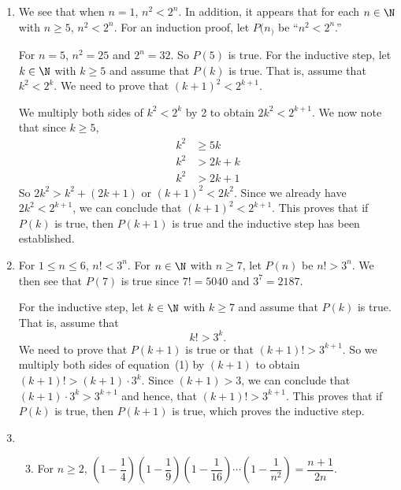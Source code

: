 \begin{enumerate}
\item We see that when $n = 1$, $n^2 < 2^n$.  In addition, it appears that for each $n \in \N$ with $n \geq 5$, $n^2 < 2^n$.  For an induction proof, let $P(n_)$ be ``$n^2 < 2^n$.''

\noindent
For $n = 5$, $n^2 = 25$ and $2^n = 32$.  So $P(5)$ is true.  For the inductive step, let $k \in \N$ with $k \geq 5$ and assume that $P(k)$ is true.  That is, assume that $k^2 < 2^k$.   We need to prove that 
$(k + 1)^2 < 2^{k+1}$.

\noindent
We multiply both sides of $k^2 < 2^k$ by 2 to obtain $2k^2 < 2^{k+1}$.  We now note that since $k \geq 5$,
\begin{align*}
k^2 &\geq 5k \\
k^2 &> 2k + k \\
k^2 &> 2k + 1
\end{align*}
So $2k^2 > k^2 + (2k + 1)$ or $(k + 1)^2 < 2k^2$.  Since we already have $2k^2 < 2^{k+1}$, we can conclude that $(k + 1)^2 < 2^{k + 1}$.  This proves that if $P(k)$ is true, then $P(k + 1)$ is true and the inductive step has been established.


\item For $1 \leq n \leq 6$, $n! < 3^n$.  For $n \in \N$ with $n \geq 7$, let $P(n)$ be $n! > 3^n$.  We then see that $P(7)$ is true since $7! = 5040$ and $3^7 = 2187$.

\noindent
For the inductive step, let $k \in \N$ with $k \geq 7$ and assume that $P(k)$ is true.    That is, assume that
\setcounter{equation}{0}
\begin{equation}
k! > 3^k.
\end{equation}
We need to prove that $P(k + 1)$ is true or that $(k + 1)! > 3^{k+1}$.  So we multiply both sides of equation~(1) by $(k + 1)$ to obtain $(k + 1)! > (k + 1)\cdot 3^k$.  Since $(k + 1) > 3$, we can conclude that 
$(k + 1) \cdot 3^k > 3^{k + 1}$ and hence, that $(k + 1)! > 3^{k+1}$.  This proves that if $P(k)$ is true, then $P(k + 1)$ is true, which proves the inductive step.





\item \begin{enumerate} \setcounter{enumii}{2}
\item For $n \geq 2$, $\left( {1 - \dfrac{1}{4}} \right)\left( {1 - \dfrac{1}{9}} \right)\left( {1 - \dfrac{1}{{16}}} \right) \cdots \left( {1 - \dfrac{1}{{n^2 }}} \right) = \dfrac{n+1}{2n}$.


\end{enumerate}
\end{enumerate}
